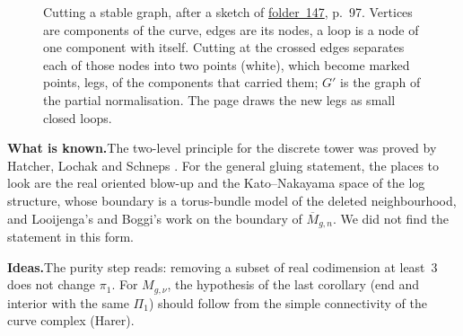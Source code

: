 \documentclass[11pt]{article}
\newcommand{\fac}[1]{\href{https://grothendieck.umontpellier.fr/#1.pdf}{folder~#1}}
\theoremstyle{definition}
\theoremstyle{plain}\newtheorem*{proposition}{Proposition}\theoremstyle{definition}
\newcommand{\entry}[1]{\par\medskip\noindent\textbf{#1}\enspace}
\newcommand{\known}{\entry{What is known.}}
\newcommand{\ideas}{\entry{Ideas.}}
\begin{document}
\begin{figure}[ht]
\centering
{}\qquad\qquad
{}
\caption{Cutting a stable graph, after a sketch of \fac{147}, p.~97. Vertices are components of the curve, edges are its nodes, a loop is a node of one component with itself. Cutting at the crossed edges separates each of those nodes into two points (white), which become marked points, legs, of the components that carried them; $G'$ is the graph of the partial normalisation. The page draws the new legs as small closed loops.}\label{fig:cut}
\end{figure}

\known The two-level principle for the discrete tower was proved by Hatcher, Lochak and Schneps \cite{hls}. For the general gluing statement, the places to look are the real oriented blow-up and the Kato--Nakayama space of the log structure, whose boundary is a torus-bundle model of the deleted neighbourhood, and Looijenga's and Boggi's work on the boundary of $\overline M_{g,n}$. We did not find the statement in this form.

\ideas The purity step reads: removing a subset of real codimension at least~$3$ does not change $\pi_1$. For $M_{g,\nu}$, the hypothesis of the last corollary (end and interior with the same $\Pi_1$) should follow from the simple connectivity of the curve complex (Harer).
\end{document}
